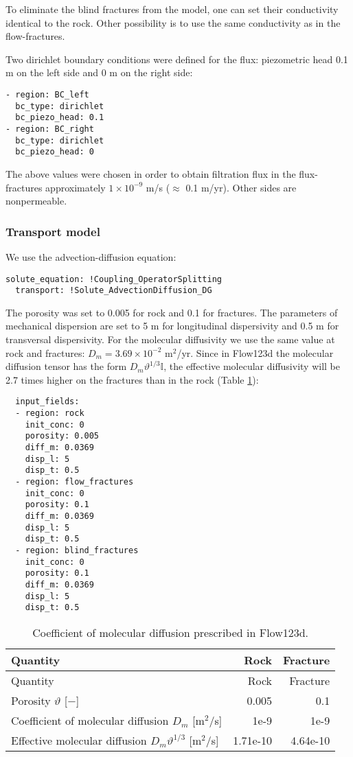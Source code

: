 To eliminate the blind fractures from the model, one can set their
conductivity identical to the rock. Other possibility is to use the same
conductivity as in the flow-fractures.

Two dirichlet boundary conditions were defined for the flux: piezometric
head 0.1 m on the left side and 0 m on the right side:

\begin{verbatim}
- region: BC_left
  bc_type: dirichlet
  bc_piezo_head: 0.1
- region: BC_right
  bc_type: dirichlet
  bc_piezo_head: 0
\end{verbatim}

The above values were chosen in order to obtain filtration flux in the
flux-fractures approximately \(1 \times 10^{-9}\) m/s (\(\approx\) 0.1
m/yr). Other sides are nonpermeable.

\subsubsection{Transport model}

We use the advection-diffusion equation:

\begin{verbatim}
solute_equation: !Coupling_OperatorSplitting
  transport: !Solute_AdvectionDiffusion_DG
\end{verbatim}

The porosity was set to 0.005 for rock and 0.1 for fractures. The
parameters of mechanical dispersion are set to 5 m for longitudinal
dispersivity and 0.5 m for transversal dispersivity. For the molecular
diffusivity we use the same value at rock and fractures:
\(D_m = 3.69 \times 10^{-2}\) m\(^2\)/yr. Since in Flow123d the
molecular diffusion tensor has the form \(D_m\vartheta^{1/3}\mathbb I\),
the effective molecular diffusivity will be 2.7 times higher on the
fractures than in the rock (Table \ref{tbl:coefDiff}):

\begin{verbatim}
  input_fields:
  - region: rock
    init_conc: 0
    porosity: 0.005
    diff_m: 0.0369
    disp_l: 5
    disp_t: 0.5
  - region: flow_fractures
    init_conc: 0
    porosity: 0.1
    diff_m: 0.0369
    disp_l: 5
    disp_t: 0.5
  - region: blind_fractures
    init_conc: 0
    porosity: 0.1
    diff_m: 0.0369
    disp_l: 5
    disp_t: 0.5
\end{verbatim}

\begin{longtable}[c]{@{}lrr@{}}
\caption{Coefficient of molecular diffusion prescribed in Flow123d.
\label{tbl:coefDiff}}\tabularnewline
\toprule
Quantity & Rock & Fracture\tabularnewline
\midrule
\endfirsthead
\toprule
Quantity & Rock & Fracture\tabularnewline
\midrule
\endhead
Porosity \(\vartheta\) {[}\(-\){]} & 0.005 & 0.1\tabularnewline
Coefficient of molecular diffusion \(D_m\) {[}m\(^2\)/s{]} & 1e-9 &
1e-9\tabularnewline
Effective molecular diffusion \(D_m\vartheta^{1/3}\) {[}m\(^2\)/s{]} &
1.71e-10 & 4.64e-10\tabularnewline
\bottomrule
\end{longtable}

